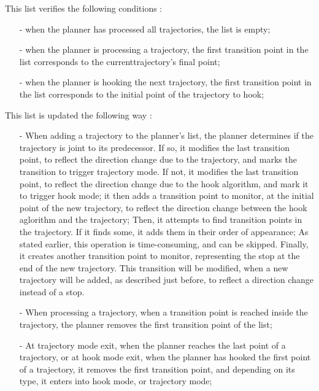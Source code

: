 This list verifies the following conditions :
\begin{itemize}

\item[-] when the planner has processed all trajectories, the list is empty;

\item[-] when the planner is processing a trajectory, the first transition point in the list corresponds to 
the currenttrajectory's final point;

\item[-] when the planner is hooking the next trajectory, the first transition point in the list corresponds
to the initial point of the trajectory to hook;

\end{itemize}

This list is updated the following way :

\begin{itemize}

\item[-] When adding a trajectory to the planner's list, the planner determines if the trajectory is joint to 
its predecessor.
If so, it modifies the last transition point, to reflect the direction change due to the trajectory, 
and marks the transition to trigger trajectory mode.
If not, it modifies the last transition point, to reflect the direction change due to the hook algorithm, 
and mark it to trigger hook mode;
it then adds a transition point to monitor, at the initial point of the new trajectory, to reflect the 
direction change between the hook aglorithm and the trajectory;
Then, it attempts to find transition points in the trajectory.
If it finds some, it adds them in their order of appearance;
As stated earlier, this operation is time-consuming, and can be skipped.
Finally, it creates another transition point to monitor, representing the stop at the end of the new 
trajectory. This transition will be modified, when a new trajectory will be added, as described just before, 
to reflect a direction change instead of a stop.

\item[-] When processing a trajectory, when a transition point is reached inside the trajectory, the planner 
removes the first transition point of the list;

\item[-] At trajectory mode exit, when the planner reaches the last point of a trajectory, or at hook mode 
exit, when the planner has hooked the first point of a trajectory, it removes the first transition point, 
and depending on its type, it enters into hook mode, or trajectory mode;

\end{itemize}

